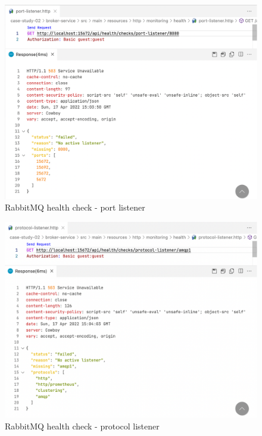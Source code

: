 \begin{figure}[H]
	\centering
	\includegraphics[width=1.0\linewidth]{./assets/images/case-studies/cs02-hc4.png}
	\caption{RabbitMQ health check - port listener}
	\label{fig:cs02-hc4}
\end{figure}

\begin{figure}[H]
	\centering
	\includegraphics[width=1.0\linewidth]{./assets/images/case-studies/cs02-hc5.png}
	\caption{RabbitMQ health check - protocol listener}
	\label{fig:cs02-hc5}
\end{figure}

